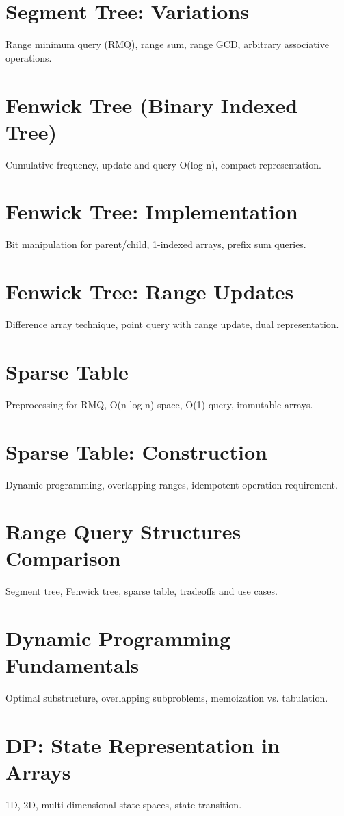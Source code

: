 \chapter{Segment Tree: Variations}
Range minimum query (RMQ), range sum, range GCD, arbitrary associative operations.

\chapter{Fenwick Tree (Binary Indexed Tree)}
Cumulative frequency, update and query O(log n), compact representation.

\chapter{Fenwick Tree: Implementation}
Bit manipulation for parent/child, 1-indexed arrays, prefix sum queries.

\chapter{Fenwick Tree: Range Updates}
Difference array technique, point query with range update, dual representation.

\chapter{Sparse Table}
Preprocessing for RMQ, O(n log n) space, O(1) query, immutable arrays.

\chapter{Sparse Table: Construction}
Dynamic programming, overlapping ranges, idempotent operation requirement.

\chapter{Range Query Structures Comparison}
Segment tree, Fenwick tree, sparse table, tradeoffs and use cases.


\chapter{Dynamic Programming Fundamentals}
Optimal substructure, overlapping subproblems, memoization vs. tabulation.

\chapter{DP: State Representation in Arrays}
1D, 2D, multi-dimensional state spaces, state transition.

